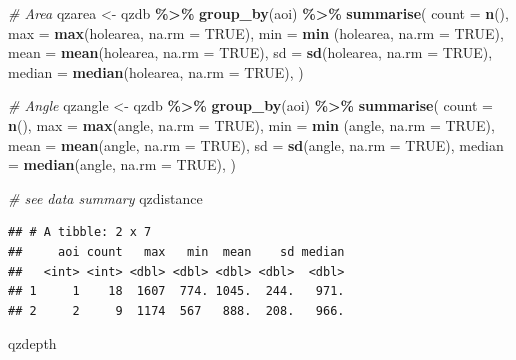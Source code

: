 \documentclass[
]{article}
\newenvironment{Shaded}{\begin{snugshade}}{\end{snugshade}}
\newcommand{\AttributeTok}[1]{\textcolor[rgb]{0.13,0.29,0.53}{#1}}
\newcommand{\CommentTok}[1]{\textcolor[rgb]{0.56,0.35,0.01}{\textit{#1}}}
\newcommand{\ConstantTok}[1]{\textcolor[rgb]{0.56,0.35,0.01}{#1}}
\newcommand{\FunctionTok}[1]{\textcolor[rgb]{0.13,0.29,0.53}{\textbf{#1}}}
\newcommand{\NormalTok}[1]{#1}
\newcommand{\OtherTok}[1]{\textcolor[rgb]{0.56,0.35,0.01}{#1}}
\newcommand{\SpecialCharTok}[1]{\textcolor[rgb]{0.81,0.36,0.00}{\textbf{#1}}}
\begin{document}
\begin{Shaded}
\begin{Highlighting}[]
\CommentTok{\# Area}
\NormalTok{qzarea }\OtherTok{\textless{}{-}}\NormalTok{ qzdb }\SpecialCharTok{\%\textgreater{}\%} \FunctionTok{group\_by}\NormalTok{(aoi) }\SpecialCharTok{\%\textgreater{}\%}
      \FunctionTok{summarise}\NormalTok{(}
      \AttributeTok{count =} \FunctionTok{n}\NormalTok{(),}
      \AttributeTok{max =} \FunctionTok{max}\NormalTok{(holearea, }\AttributeTok{na.rm =} \ConstantTok{TRUE}\NormalTok{),}
      \AttributeTok{min =} \FunctionTok{min}\NormalTok{ (holearea, }\AttributeTok{na.rm =} \ConstantTok{TRUE}\NormalTok{),}
      \AttributeTok{mean =} \FunctionTok{mean}\NormalTok{(holearea, }\AttributeTok{na.rm =} \ConstantTok{TRUE}\NormalTok{),}
      \AttributeTok{sd =} \FunctionTok{sd}\NormalTok{(holearea, }\AttributeTok{na.rm =} \ConstantTok{TRUE}\NormalTok{),}
      \AttributeTok{median =} \FunctionTok{median}\NormalTok{(holearea, }\AttributeTok{na.rm =} \ConstantTok{TRUE}\NormalTok{),}
\NormalTok{  ) }

\CommentTok{\# Angle}
\NormalTok{qzangle }\OtherTok{\textless{}{-}}\NormalTok{ qzdb }\SpecialCharTok{\%\textgreater{}\%} \FunctionTok{group\_by}\NormalTok{(aoi) }\SpecialCharTok{\%\textgreater{}\%}
      \FunctionTok{summarise}\NormalTok{(}
      \AttributeTok{count =} \FunctionTok{n}\NormalTok{(),}
      \AttributeTok{max =} \FunctionTok{max}\NormalTok{(angle, }\AttributeTok{na.rm =} \ConstantTok{TRUE}\NormalTok{),}
      \AttributeTok{min =} \FunctionTok{min}\NormalTok{ (angle, }\AttributeTok{na.rm =} \ConstantTok{TRUE}\NormalTok{),}
      \AttributeTok{mean =} \FunctionTok{mean}\NormalTok{(angle, }\AttributeTok{na.rm =} \ConstantTok{TRUE}\NormalTok{),}
      \AttributeTok{sd =} \FunctionTok{sd}\NormalTok{(angle, }\AttributeTok{na.rm =} \ConstantTok{TRUE}\NormalTok{),}
      \AttributeTok{median =} \FunctionTok{median}\NormalTok{(angle, }\AttributeTok{na.rm =} \ConstantTok{TRUE}\NormalTok{),}
\NormalTok{  ) }

\CommentTok{\# see data summary}
\NormalTok{qzdistance}
\end{Highlighting}
\end{Shaded}

\begin{verbatim}
## # A tibble: 2 x 7
##     aoi count   max   min  mean    sd median
##   <int> <int> <dbl> <dbl> <dbl> <dbl>  <dbl>
## 1     1    18  1607  774. 1045.  244.   971.
## 2     2     9  1174  567   888.  208.   966.
\end{verbatim}

\begin{Shaded}
\begin{Highlighting}[]
\NormalTok{qzdepth}
\end{Highlighting}
\end{Shaded}
\end{document}
